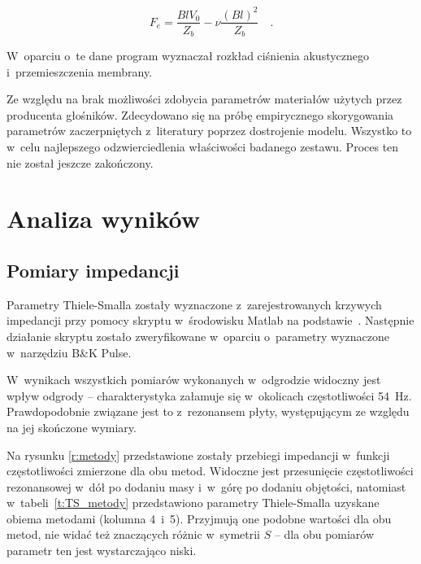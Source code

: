 \documentclass[12pt]{oska}
\begin{document}
		\begin{equation}
			F_e=\frac{BlV_0}{Z_b}-\nu\frac{(Bl)^2}{Z_b} \quad. \label{eq:sila}
		\end{equation}

		
		W~oparciu o~te dane program wyznaczał rozkład ciśnienia akustycznego i~przemieszczenia membrany.
		
		Ze względu na brak możliwości zdobycia parametrów materiałów użytych przez producenta głośników. Zdecydowano się na próbę empirycznego skorygowania parametrów zaczerpniętych z~literatury \cite{modelowanie} poprzez dostrojenie modelu. Wszystko to w~celu najlepszego odzwierciedlenia właściwości badanego zestawu. Proces ten nie został jeszcze zakończony.
		
		
		

\section{Analiza wyników}

	\subsection{Pomiary impedancji}
		
		Parametry Thiele-Smalla zostały wyznaczone z~zarejestrowanych krzywych impedancji przy pomocy skryptu w~środowisku Matlab na podstawie~\cite{dobrucki}. Następnie działanie skryptu zostało zweryfikowane w~oparciu o~parametry wyznaczone w~narzędziu B\&K Pulse. 
		
		W~wynikach wszystkich pomiarów wykonanych w~odgrodzie widoczny jest wpływ odgrody -- charakterystyka załamuje się w~okolicach częstotliwości \SI{54}{\hertz}. Prawdopodobnie związane jest to z~rezonansem płyty, występującym ze względu na jej skończone wymiary.
		
		Na rysunku \ref{r:metody} przedstawione zostały przebiegi impedancji w~funkcji częstotliwości zmierzone dla obu metod. Widoczne jest przesunięcie częstotliwości rezonansowej w~dół po dodaniu masy i~w~górę po dodaniu objętości, natomiast w~tabeli~\ref{t:TS_metody} przedstawiono parametry Thiele-Smalla uzyskane obiema metodami (kolumna 4~i~5). Przyjmują one podobne wartości dla obu metod, nie widać też znaczących różnic w~symetrii $S$ -- dla obu pomiarów parametr ten jest wystarczająco niski.
		
\end{document}
